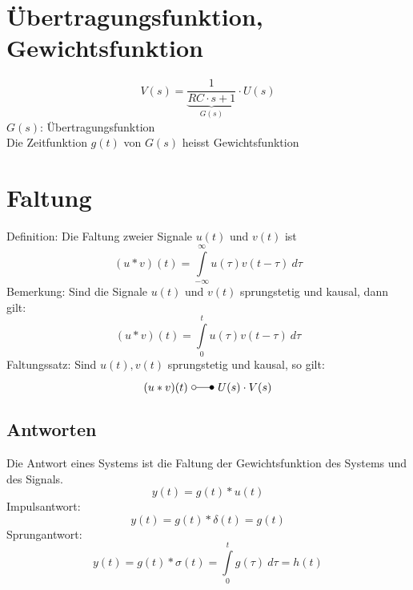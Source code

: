 \section{Übertragungsfunktion, Gewichtsfunktion}
\[ 
    V(s) = \underbrace{\frac{1}{RC \cdot s + 1}}_{G(s)} \cdot U(s) 
\]
$G(s)$: Übertragungsfunktion\\
Die Zeitfunktion $g(t)$ von $G(s)$ heisst Gewichtsfunktion\\

\section{Faltung}
Definition: Die Faltung zweier Signale $u(t)$ und $v(t)$ ist
\[ 
    (u * v)(t) = \int\limits_{-\infty}^{\infty} u(\tau) v(t - \tau) ~ d \tau 
\]
Bemerkung: Sind die Signale $u(t)$ und $v(t)$ sprungstetig und kausal, dann
gilt:
\[ 
    (u * v)(t) = \int\limits_{0}^{t} u(\tau) v(t - \tau) ~ d \tau 
\]
Faltungssatz:
Sind $u(t), v(t)$ sprungstetig und kausal, so gilt:
\[ 
    (u * v) (t) ~ \laplace ~ U(s) \cdot V(s) 
\]

\subsection{Antworten}
Die Antwort eines Systems ist die Faltung der Gewichtsfunktion des Systems und des Signals.
\[ 
    y(t) = g(t) * u(t) 
\]
Impulsantwort:
\[ 
    y(t) = g(t) * \delta(t) = g(t)
\]
Sprungantwort:
\[
    y(t) = g(t) * \sigma(t) = \int\limits_{0}^{t} g(\tau) ~d \tau = h(t)
\]


